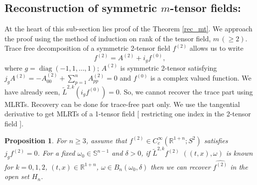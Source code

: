 \documentclass[11pt,a4paper,reqno]{amsart}
\newtheorem{proposition}[definition]
{Proposition}
\DeclareMathOperator{\diag}{diag}
\begin{document}
	\subsection{Reconstruction of symmetric $m$-tensor fields:}
	At the heart of this sub-section lies proof of the Theorem \ref{rec_mt}. We approach the proof using the method of induction on rank of the tensor field, $m \,(\geq 2)$. Trace free decomposition of a symmetric 2-tensor field $f^{(2)}$ allows us to write 
	\[
	f^{(2)}=A^{(2)}+ i_gf^{(0)},
	\]
	where $g=\diag(-1,1,\dots,1)$;  $A^{(2)}$ is symmetric 2-tensor satisfying  $j_{g}A^{(2)}= -A^{(2)}_{00}+ \sum_{p=1}^{n} A^{(2)}_{pp}=0$ and $f^{(0)}$ is a complex valued function. We have already seen, $\tilde{L}^{2,k}(i_g f^{(0)})=0$.
	So, we cannot recover the trace part using MLRTs. Recovery can be done for trace-free part only. We use the tangential derivative to get MLRTs of a 1-tensor field [ restricting one index in the 2-tensor field ].
	\begin{proposition}
		\label{rec_2t}
		For $n\geq3$, assume that $f^{(2)}\in C_{c}^{\infty}(\mathbb{R}^{1+n};S^2)$ satisfies $j_gf^{(2)}=0$. For a fixed $\omega_0 \in \mathbb{S}^{n-1}$ and $\delta >0$, if $\tilde{L}^{2,k}f^{(2)}$ $((t,x),\omega)$ is known for $k=0,1,2$, $(t,x)\in \mathbb{R}^{1+n}$, $\omega \in B_{n}(\omega_0,\delta)$  then we can recover $\widehat{f^{(2)}}$ in the open set $H_n$.
	\end{proposition}
\end{document}
